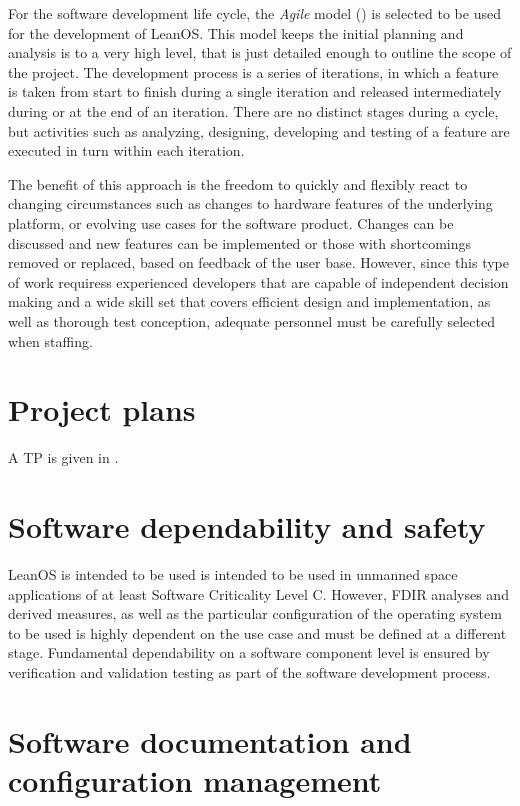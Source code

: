 For the software development life cycle, the \emph{Agile} model ()
is selected to be used for the development of LeanOS.
This model keeps the initial planning and analysis is to a very high level, that
is just detailed enough to outline the scope of the project. The development
process is a series of iterations, in which a feature is taken from start to
finish during a single iteration and released intermediately during or at the
end of an iteration.
There are no distinct stages during a cycle, but activities
such as analyzing, designing, developing and testing of a feature are executed
in turn within each iteration.

The benefit of this approach is the freedom to quickly and flexibly react to
changing circumstances such as changes to hardware features of the underlying
platform, or evolving use cases for the software product. Changes can be
discussed and new features can be implemented or those with shortcomings removed
or replaced, based on feedback of the user base.
However, since this type of
work requiress experienced developers that are capable of independent decision
making and a wide skill set that covers efficient design and implementation, as
well as thorough test conception, adequate personnel must be carefully selected
when staffing.



\section{Project plans}

A \glsdesc{TP} is given in \cite{leanosTP}.


\section{Software dependability and safety}

LeanOS is intended to be used is intended to be used in unmanned space
applications of at least Software Criticality Level C. However, \gls{FDIR}
analyses and derived measures, as well as the particular configuration of
the operating system to be used is highly dependent on the use case and must
be defined at a different stage. Fundamental dependability on a software
component level is ensured by verification and validation testing as part of the
software development process.


\section{Software documentation and configuration management}

